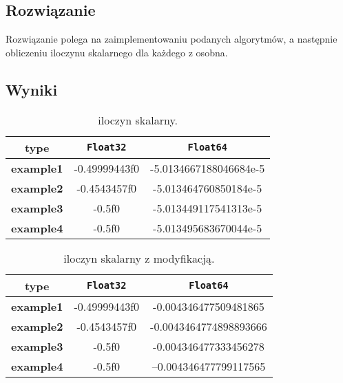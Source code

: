 \documentclass{article}
\begin{document}
\begin{center}
    \subsection{Rozwiązanie}
    \large Rozwiązanie polega na zaimplementowaniu podanych algorytmów, a następnie obliczeniu iloczynu skalarnego dla każdego z osobna.
    \subsection{Wyniki}

    \begin{table}[h!]
    \centering
    \begin{tabular}{||c c c||} 
    \hline
    \textbf{type} & \texttt{Float32} & \texttt{Float64} \\ [0.5ex]
    \hline\hline
    \textbf{example1} & -0.49999443f0 & -5.0134667188046684e-5 \\ 
    \textbf{example2} & -0.4543457f0 & -5.013464760850184e-5 \\ 
    \textbf{example3} & -0.5f0 & -5.013449117541313e-5 \\ 
    \textbf{example4} & -0.5f0 & -5.013495683670044e-5 \\ 
    \hline
    \end{tabular}
    \caption{iloczyn skalarny.}
    \label{table:1}
    \end{table}
     
    \begin{table}[h!]
    \centering
    \begin{tabular}{||c c c||} 
    \hline
    \textbf{type} & \texttt{Float32} & \texttt{Float64} \\ [0.5ex]
    \hline\hline
    \textbf{example1} & -0.49999443f0 & -0.004346477509481865 \\ 
    \textbf{example2} & -0.4543457f0 & -0.0043464774898893666 \\ 
    \textbf{example3} & -0.5f0 & -0.004346477333456278 \\ 
    \textbf{example4} & -0.5f0 & --0.004346477799117565 \\ 
    \hline
    \end{tabular}
    \caption{iloczyn skalarny z modyfikacją.}
    \label{table:2}
    \end{table}
    \newpage

\end{center}
\end{document}
